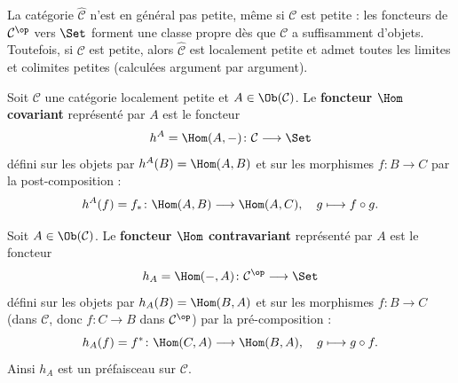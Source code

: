 \begin{remarque}\label{rem:prefaisceau-taille}
La catégorie $\widehat{\mathcal{C}}$ n'est en général pas petite, même si
$\mathcal{C}$ est petite : les foncteurs de $\mathcal{C}^{\op}$ vers $\Set$
forment une classe propre dès que $\mathcal{C}$ a suffisamment d'objets.
Toutefois, si $\mathcal{C}$ est petite, alors $\widehat{\mathcal{C}}$ est
localement petite et admet toutes les limites et colimites petites
(calculées argument par argument).
\end{remarque}

\begin{definition}\label{def:hom-covariant}
Soit $\mathcal{C}$ une catégorie localement petite et $A \in \Ob(\mathcal{C})$.
Le \textbf{foncteur $\Hom$ covariant} représenté par $A$ est le foncteur
\[
    h^A = \Hom(A, -) \colon \mathcal{C} \longrightarrow \Set
\]
défini sur les objets par $h^A(B) = \Hom(A, B)$ et sur les morphismes
$f \colon B \to C$ par la post-composition :
\[
    h^A(f) = f_* \colon \Hom(A, B) \longrightarrow \Hom(A, C), \quad
    g \longmapsto f \circ g.
\]
\end{definition}

\begin{definition}\label{def:hom-contravariant}
Soit $A \in \Ob(\mathcal{C})$.
Le \textbf{foncteur $\Hom$ contravariant} représenté par $A$ est le foncteur
\[
    h_A = \Hom(-, A) \colon \mathcal{C}^{\op} \longrightarrow \Set
\]
défini sur les objets par $h_A(B) = \Hom(B, A)$ et sur les morphismes
$f \colon B \to C$ (dans $\mathcal{C}$, donc $f \colon C \to B$ dans
$\mathcal{C}^{\op}$) par la pré-composition :
\[
    h_A(f) = f^* \colon \Hom(C, A) \longrightarrow \Hom(B, A), \quad
    g \longmapsto g \circ f.
\]
Ainsi $h_A$ est un préfaisceau sur $\mathcal{C}$.
\end{definition}

